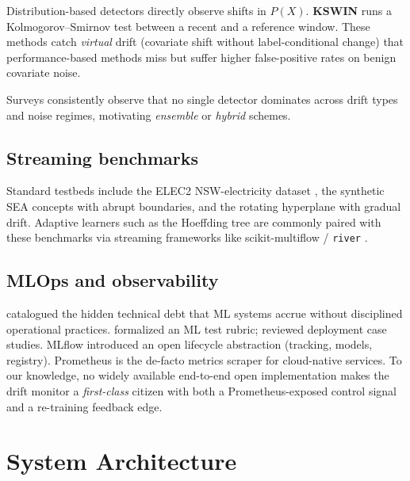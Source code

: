 \documentclass[conference]{IEEEtran}
\begin{document}
Distribution-based detectors directly observe shifts in $P(X)$. \textbf{KSWIN}
\cite{raab2020kswin} runs a Kolmogorov--Smirnov test between a recent and a
reference window. These methods catch \emph{virtual} drift (covariate shift
without label-conditional change) that performance-based methods miss but
suffer higher false-positive rates on benign covariate noise.

Surveys \cite{gama2014survey, lu2018learning} consistently observe that no
single detector dominates across drift types and noise regimes, motivating
\emph{ensemble} or \emph{hybrid} schemes.

\subsection{Streaming benchmarks}

Standard testbeds include the ELEC2 NSW-electricity dataset
\cite{harries1999elec}, the synthetic SEA concepts \cite{street2001sea} with
abrupt boundaries, and the rotating hyperplane \cite{hulten2001hyperplane}
with gradual drift. Adaptive learners such as the Hoeffding tree
\cite{domingos2000hoeffding} are commonly paired with these benchmarks via
streaming frameworks like scikit-multiflow / \texttt{river}
\cite{montiel2018river}.

\subsection{MLOps and observability}

\cite{sculley2015hidden} catalogued the hidden technical debt that ML systems
accrue without disciplined operational practices.
\cite{breck2017tfx} formalized an ML test rubric;
\cite{paleyes2022mlops} reviewed deployment case studies.
MLflow \cite{zaharia2018mlflow} introduced an open lifecycle abstraction
(tracking, models, registry). Prometheus \cite{prometheus2024} is the de-facto
metrics scraper for cloud-native services. To our knowledge, no widely
available end-to-end open implementation makes the drift monitor a
\emph{first-class} citizen with both a Prometheus-exposed control signal and a
re-training feedback edge.

\section{System Architecture}
\label{sec:system}
\end{document}
